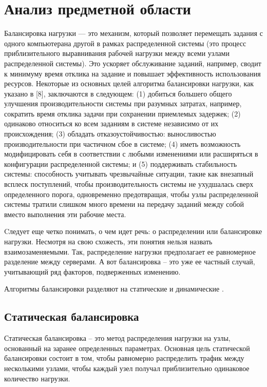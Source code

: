 \chapter{Анализ предметной области}

Балансировка нагрузки --- это механизм, который позволяет перемещать задания с одного компьютерана другой в рамках распределенной системы (это процесс приблизительного выравнивания рабочей нагрузки между всеми узлами распределенной системы).
Это ускоряет обслуживание заданий, например, сводит к минимуму время отклика на задание и повышает эффективность использования ресурсов.
Некоторые из основных целей алгоритма балансировки нагрузки, как указано в [8], заключаются в следующем: (1) добиться большего общего улучшения производительности системы при разумных затратах, например, сократить время отклика задачи при сохранении приемлемых задержек; (2) одинаково относиться ко всем заданиям в системе независимо от их происхождения; (3) обладать отказоустойчивостью:
выносливостью производительности при частичном сбое в системе; (4) иметь возможность модифицировать себя в соответствии с любыми изменениями или расширяться в конфигурации распределенной системы; и (5) поддерживать стабильность системы: способность учитывать чрезвычайные ситуации, такие как внезапный всплеск поступлений, чтобы производительность системы не ухудшалась сверх определенного порога, одновременно предотвращая, чтобы узлы распределенной системы тратили слишком много времени на передачу заданий между собой вместо выполнения эти рабочие места. \cite{4}	

Cледует еще четко понимать, о чем идет речь: о распределении или балансировке нагрузки. Несмотря на свою схожесть, эти понятия нельзя назвать взаимозаменяемыми. Так, распределение нагрузки предполагает ее равномерное разделение между серверами. А вот балансировка – это уже ее частный случай, учитывающий ряд факторов, подверженных изменению. \cite{4}

Алгоритмы балансировки разделяют на статические и динамические \cite{uzel}.
\section{Статическая балансировка}
Статическая балансировка – это метод распределения нагрузки на узлы, основанный на заранее определенных параметрах.
Основная цель статической балансировки состоит в том, чтобы равномерно распределить трафик между несколькими узлами, чтобы каждый узел получал приблизительно одинаковое количество нагрузки.

